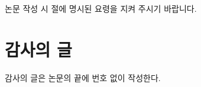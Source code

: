 \documentclass[a4paper,twocolumn]{article}
\begin{document}
논문 작성 시 절에 명시된 요령을 지켜 주시기 바랍니다.


\section*{감사의 글}

감사의 글은 논문의 끝에 번호 없이 작성한다.



\nocite{*}


\end{document}

